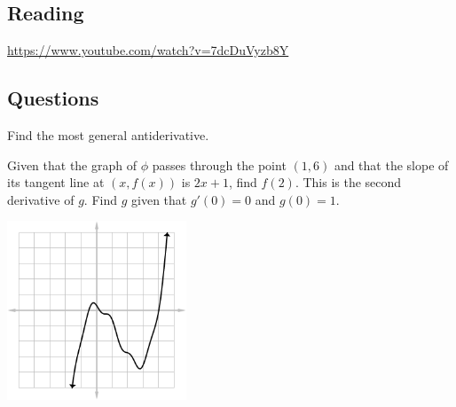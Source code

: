 


\subsection*{Reading}
\begin{center}
\begin{tcolorbox}[width=0.8\textwidth,colback={red},title={\textbf{Go and watch...}},colbacktitle=yellow,coltitle=blue]
  \textcolor{white}{\url{https://www.youtube.com/watch?v=7dcDuVyzb8Y}}
\end{tcolorbox}
\end{center}

\subsection*{Questions}
\begin{questions}
  \question Find the most general antiderivative.
  \question Given that the graph of $ \phi $ passes through the point $ (1, 6) $
            and that the slope of its tangent line at $ (x, f(x)) $ is $ 2x + 1 $,
            find $ f(2) $.
  \question This is the second derivative of $ g $. Find $ g $ given that $ g'(0) = 0 $ and $ g(0) = 1 $.
            \begin{center}
              \includegraphics[width=0.4\textwidth]{anti7}
            \end{center}
\end{questions}


